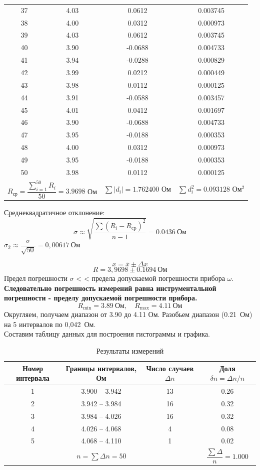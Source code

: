\documentclass[14pt,a4paper]{extarticle}
\begin{document}
{\begin{longtable}{|c|c|c|c|}
37 & 4.03 & 0.0612 & 0.003745 \\
38 & 4.00 & 0.0312 & 0.000973 \\
39 & 4.03 & 0.0612 & 0.003745 \\
40 & 3.90 & -0.0688 & 0.004733 \\
41 & 3.94 & -0.0288 & 0.000829 \\
42 & 3.99 & 0.0212 & 0.000449 \\
43 & 3.98 & 0.0112 & 0.000125 \\
44 & 3.91 & -0.0588 & 0.003457 \\
45 & 4.01 & 0.0412 & 0.001697 \\
46 & 3.90 & -0.0688 & 0.004733 \\
47 & 3.95 & -0.0188 & 0.000353 \\
48 & 4.00 & 0.0312 & 0.000973 \\
49 & 3.95 & -0.0188 & 0.000353 \\
50 & 3.98 & 0.0112 & 0.000125 \\
\hline
\multicolumn{2}{|c|}{\(R_{\text{ср}} = \dfrac{\sum_{i=1}^{50} R_i}{50} = 3.9698\) Ом} & 
\(\sum |d_i| = 1.762400
\) Ом & 
\(\sum d_i^2 = 0.093128\) Ом\(^2\) \\
\hline
\end{longtable}
}
Среднеквадратичное отклонение:
\[
\sigma \approx \sqrt{\frac{\sum (R_i - R_{\text{cp}})^{2}}{n-1}} = 0.0436~\text{Ом}
\]
\( \sigma_{\bar{x}} \approx \dfrac{\sigma}{\sqrt{50}} = 0{,}00617~\text{Ом} \)

\[
x = \overline{x} \pm \Delta x
\]
\[
R = 3{,}9698 \pm 0.1694~\text{Ом}
\]
Предел погрешности  \(\sigma\) < < предела допускаемой погрешности прибора  \(\omega\).
\\\textbf{Следовательно погрешность измерений равна инструментальной погрешности - пределу допускаемой погрешности прибора.}
\[
R_{\text{min}} = 3.89~\text{Ом},\quad R_{\text{max}} = 4.11~\text{Ом}
\]
Округляем, получаем диапазон от 3.90 до 4.11 Ом. Разобьем диапазон (0.21~Ом) на 5 интервалов по 0,042~Ом.
\\Составим таблицу данных для построения гистограммы и графика.
\begin{table}[ht!]
\centering
\caption{Результаты измерений}
\label{tab:results}
\small
\begin{tabular}{|c|c|c|c|}
\hline
Номер интервала & Границы интервалов, Ом & Число случаев $\Delta n$ & Доля $\delta n = \Delta n / n$ \\
\hline
1 & 3.900 – 3.942 & 13 & 0.26 \\
2 & 3.942 – 3.984 & 16 & 0.32 \\
3 & 3.984 – 4.026 & 16 & 0.32 \\ 
4 & 4.026 – 4.068 & 4 & 0.08 \\
5 & 4.068 – 4.110 & 1 & 0.02 \\

\hline
\multicolumn{3}{|c|}{$n = \sum \Delta n = 50$} & $\dfrac{\sum \Delta} n = 1.000$ \\
\hline
\end{tabular}
\end{table}
\newpage
\end{document}

